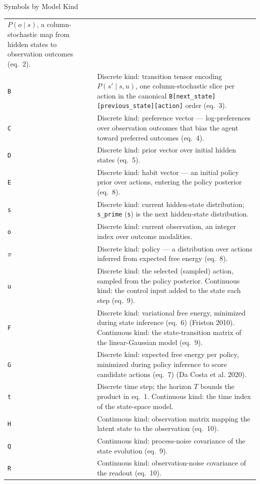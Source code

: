 \documentclass[
  ignorenonframetext,
]{beamer}
\begin{document}
\begin{frame}{Symbols by Model Kind}
\begin{longtable}[]{@{}
  >{\raggedright\arraybackslash}p{}
  >{\raggedright\arraybackslash}p{}@{}}
\(P(o \mid s)\), a column-stochastic map from hidden states to
observation outcomes (eq.~2). \\
\texttt{B} & Discrete kind: transition tensor encoding
\(P(s' \mid s, u)\), one column-stochastic slice per action in the
canonical \texttt{B{[}next\_state{]}{[}previous\_state{]}{[}action{]}}
order (eq.~3). \\
\texttt{C} & Discrete kind: preference vector --- log-preferences over
observation outcomes that bias the agent toward preferred outcomes
(eq.~4). \\
\texttt{D} & Discrete kind: prior vector over initial hidden states
(eq.~5). \\
\texttt{E} & Discrete kind: habit vector --- an initial policy prior
over actions, entering the policy posterior (eq.~8). \\
\texttt{s} & Discrete kind: current hidden-state distribution;
\texttt{s\_prime} (\texttt{s\textquotesingle{}}) is the next
hidden-state distribution. \\
\texttt{o} & Discrete kind: current observation, an integer index over
outcome modalities. \\
\texttt{\texorpdfstring{\ensuremath{\pi}}{pi}} & Discrete kind: policy --- a distribution over actions
inferred from expected free energy (eq.~8). \\
\texttt{u} & Discrete kind: the selected (sampled) action, sampled from
the policy posterior. Continuous kind: the control input added to the
state each step (eq.~9). \\
\texttt{F} & Discrete kind: variational free energy, minimized during
state inference (eq.~6) (Friston 2010). Continuous kind: the
state-transition matrix of the linear-Gaussian model
(eq.~9). \\
\texttt{G} & Discrete kind: expected free energy per policy, minimized
during policy inference to score candidate actions (eq.~7)
(Da Costa et al. 2020). \\
\texttt{t} & Discrete time step; the horizon \(T\) bounds the product in
eq.~1. Continuous kind: the time index of the
state-space model. \\
\texttt{H} & Continuous kind: observation matrix mapping the latent
state to the observation (eq.~10). \\
\texttt{Q} & Continuous kind: process-noise covariance of the state
evolution (eq.~9). \\
\texttt{R} & Continuous kind: observation-noise covariance of the
readout (eq.~10). \\

\end{longtable}
\end{frame}
\end{document}
